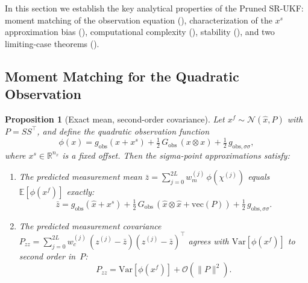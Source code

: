 \documentclass[12pt,a4paper]{article}
\newtheorem{proposition}[theorem]{Proposition}
\newcommand{\R}{\mathbb{R}}
\newcommand{\E}{\mathbb{E}}
\newcommand{\Var}{\mathrm{Var}}
\newcommand{\vect}{\mathrm{vec}}
\newcommand{\kron}{\otimes}
\newcommand{\xf}{{x^{f}}}
\newcommand{\xs}{{x^{s}}}
\newcommand{\cO}{\mathcal{O}}
\begin{document}
In this section we establish the key analytical properties of the
Pruned SR-UKF: moment matching of the observation equation
(), characterization of the $\xs$ approximation
bias (), computational complexity (),
stability (), and two limiting-case theorems
().

\subsection{Moment Matching for the Quadratic Observation}

\begin{proposition}[Exact mean, second-order covariance]
\label{prop:moment}
Let $\xf \sim \mathcal{N}(\hat{x}, P)$ with
$P = SS^\top$, and define the quadratic observation function
\begin{equation}\label{eq:phi}
\phi(x) = g_{\mathrm{obs}}(x + \xs)
  + \tfrac{1}{2}\,G_{\mathrm{obs}}\,(x \kron x)
  + \tfrac{1}{2}\,g_{\mathrm{obs},\sigma\sigma},
\end{equation}
where $\xs \in \R^{n_x}$ is a fixed offset. Then the sigma-point
approximations satisfy:
\begin{enumerate}[label=(\alph*)]
\item The predicted measurement mean
$\bar{z} = \sum_{j=0}^{2L} w_m^{(j)}\,\phi(\chi^{(j)})$
equals $\E[\phi(\xf)]$ \emph{exactly}:
\begin{equation}\label{eq:exact-mean}
\bar{z} = g_{\mathrm{obs}}(\hat{x} + \xs)
  + \tfrac{1}{2}\,G_{\mathrm{obs}}\,
    (\hat{x} \kron \hat{x} + \vect(P))
  + \tfrac{1}{2}\,g_{\mathrm{obs},\sigma\sigma}.
\end{equation}
\item The predicted measurement covariance
$P_{zz} = \sum_{j=0}^{2L} w_c^{(j)}\,(z^{(j)} - \bar{z})
(z^{(j)} - \bar{z})^\top$
agrees with $\Var[\phi(\xf)]$ to second order in~$P$:
\begin{equation}\label{eq:cov-approx}
P_{zz} = \Var[\phi(\xf)] + \cO(\|P\|^2).
\end{equation}
\end{enumerate}
\end{proposition}
\end{document}
